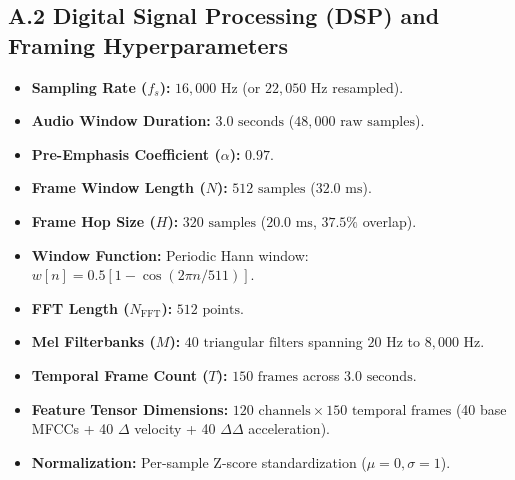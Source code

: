 \documentclass[12pt, a4paper]{report}
\begin{document}
\subsection*{A.2 Digital Signal Processing (DSP) and Framing Hyperparameters}
\begin{itemize}
    \item \textbf{Sampling Rate ($f_s$):} $16,000\text{ Hz}$ (or $22,050\text{ Hz}$ resampled).
    \item \textbf{Audio Window Duration:} $3.0\text{ seconds}$ ($48,000\text{ raw samples}$).
    \item \textbf{Pre-Emphasis Coefficient ($\alpha$):} $0.97$.
    \item \textbf{Frame Window Length ($N$):} $512\text{ samples}$ ($32.0\text{ ms}$).
    \item \textbf{Frame Hop Size ($H$):} $320\text{ samples}$ ($20.0\text{ ms}$, $37.5\%$ overlap).
    \item \textbf{Window Function:} Periodic Hann window: $w[n] = 0.5 [1 - \cos(2\pi n / 511)]$.
    \item \textbf{FFT Length ($N_{\text{FFT}}$):} $512\text{ points}$.
    \item \textbf{Mel Filterbanks ($M$):} $40\text{ triangular filters}$ spanning $20\text{ Hz}$ to $8,000\text{ Hz}$.
    \item \textbf{Temporal Frame Count ($T$):} $150\text{ frames}$ across $3.0\text{ seconds}$.
    \item \textbf{Feature Tensor Dimensions:} $120\text{ channels} \times 150\text{ temporal frames}$ (40 base MFCCs + 40 $\Delta$ velocity + 40 $\Delta\Delta$ acceleration).
    \item \textbf{Normalization:} Per-sample Z-score standardization ($\mu=0, \sigma=1$).
\end{itemize}
\end{document}
